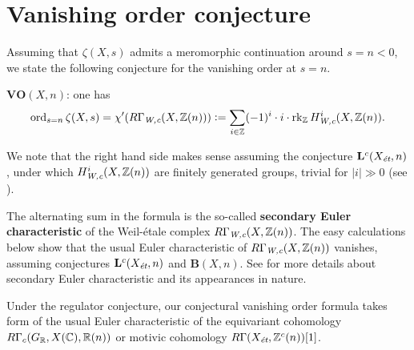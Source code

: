 \documentclass{article}
\numberwithin{equation}{section}
\begin{document}

\section{Vanishing order conjecture}
\label{sec:vanishing-order-conjecture}

Assuming that $\zeta (X,s)$ admits a meromorphic continuation around
$s = n < 0$, we state the following conjecture for the vanishing order at
$s = n$.

\begin{conjecture}
  $\mathbf{VO} (X,n)$: one has
  \[ \ord_{s=n} \zeta (X,s) =
    \chi' (R\Gamma_\Wc (X, \ZZ (n))) \dfn
    \sum_{i \in \ZZ} (-1)^i \cdot i \cdot \rk_\ZZ H^i_\Wc (X, \ZZ (n)). \]
\end{conjecture}

We note that the right hand side makes sense assuming the conjecture
$\mathbf{L}^c (X_\et,n)$, under which $H^i_\Wc (X, \ZZ (n))$ are finitely
generated groups, trivial for $|i| \gg 0$
(see \cite[Proposition~7.7]{Beshenov-Weil-etale-1}).

\begin{remark}
  The alternating sum in the formula is the so-called
  \textbf{secondary Euler characteristic} of the Weil-étale complex
  $R\Gamma_\Wc (X, \ZZ (n))$.  The easy calculations below show that the usual
  Euler characteristic of $R\Gamma_\Wc (X, \ZZ (n))$ vanishes, assuming
  conjectures $\mathbf{L}^c (X_\et,n)$ and $\mathbf{B} (X,n)$.
  See \cite{Ramachandran-2016} for more details about secondary Euler
  characteristic and its appearances in nature.
\end{remark}

Under the regulator conjecture, our conjectural vanishing order formula takes
form of the usual Euler characteristic of the equivariant cohomology
$R\Gamma_c (G_\RR, X(\CC), \RR (n))$ or motivic cohomology
$R\Gamma (X_\et, \ZZ^c (n)) [1]$.
\end{document}
